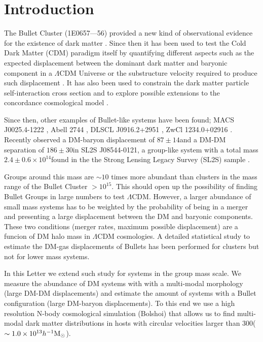 \documentclass{emulateapj}
\newcommand{\hkpc}{{\ifmmode{h^{-1}{\rm kpc}}\else{$h^{-1}$kpc }\fi}}
\newcommand{\hMsun}{{\ifmmode{h^{-1}{\rm {M_{\odot}}}}\else{$h^{-1}{\rm{M_{\odot}}}$}\fi}}
\newcommand{\Msun}{{\ifmmode{{\rm {M_{\odot}}}}\else{${\rm{M_{\odot}}}$}\fi}}
\newcommand{\kms}{{\ifmmode{{\mathrm{\,km\ s}^{-1}}}\else{\,km~s$^{-1}$}\fi}}
\newcommand{\bulla}{1E0657---56}
\newcommand{\bullg}{SL2S J08544-0121}
\begin{document}
\section{Introduction}


The Bullet Cluster (\bulla) provided a new kind of observational
evidence for the existence of dark matter
\citep{Markevitch2004,Clowe2006}. Since then it has been used to test
the Cold Dark Matter (CDM) paradigm itself by quantifying different
aspects such as the expected displacement between the dominant dark
matter and baryonic component in a $\Lambda$CDM Universe
\citep{ForeroRomero2010} or the substructure velocity required to
produce such displacement \citep{Hayashi2006, Springel2007,
  Thompson2012}. It has also been used to constrain the dark matter
particle self-interaction cross section and to explore possible
extensions to the concordance cosmological model
\citep{Farrar2007,Lee2010,Lee2012}.      
 

Since then, other examples of Bullet-like systems have been found; 
MACS J0025.4-1222 \citep{Bradac2008}, Abell 2744 \citep{Merten2011},
DLSCL J0916.2+2951 \citep{Dawson2012}, ZwCl 1234.0+02916
\citep{Dahle2013}. Recently \citep{Gastaldello} observed a DM-baryon
displacement of $87\pm 14$\hkpc and a DM-DM separation of $186\pm
30$\hkpc in \bullg, a group-like system with a total
mass $2.4\pm 0.6 \times 10^{14}$\Msun found in the the Strong Lensing
Legacy Survey (SL2S) sample \citep{Cabanac2007,More2012}.


Groups around this mass are $\sim10$ times more abundant than clusters
in the mass range of the Bullet Cluster $>10^{15}$\hMsun. This 
should open up the possibility of finding Bullet Groups in large
numbers to test $\Lambda$CDM. However, a larger abundance of small
mass systems has to be weighted by the probability of being in a
merger and  presenting a large displacement between the DM and
baryonic components.  These two conditions (merger rates, maximum
possible displacement) are a funcion of DM halo mass in $\Lambda$CDM
cosmologies.  A detailed statistical study to estimate the DM-gas
displacements of Bullets has been performed for clusters
\citep{ForeroRomero2010} but not for lower mass systems.

In this Letter we extend such study for systems in the group mass
scale. We measure the abundance of DM systems with with a multi-modal
morphology (large DM-DM displacements) and estimate the amount of
systems with a Bullet configuration  (large DM-baryon
displacements). To this end we use a high resolution N-body
cosmological simulation (Bolshoi) that allows us to find  multi-modal
dark matter distributions in hosts with circular velocities larger
than $300$\kms ($\sim 1.0\times 10^{13}\hMsun$).
\end{document}
